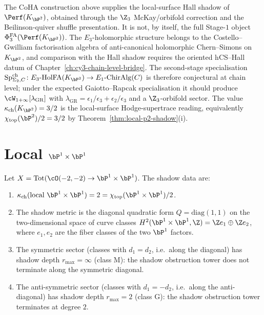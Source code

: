 \begin{remark}[Relation to \texorpdfstring{$\Phi_3$}{Phi-3} and \texorpdfstring{$\kappa_{\mathrm{ch}}(K_{\bP^2}) = 3/2$}{kappa-ch(K-P-2) = 3/2}]
\label{rem:local-p2-phi3-kappa}
The CoHA construction above supplies the local-surface Hall shadow of
$\Perf(K_{\bP^2})$, obtained through the $\Z_3$ McKay/orbifold
correction and the Beilinson-quiver shuffle presentation. It is not, by
itself, the full Stage-$1$ object
$\PhiFA_3(\Perf(K_{\bP^2}))$. The $E_3$-holomorphic structure belongs to
the Costello--Gwilliam factorisation algebra of anti-canonical
holomorphic Chern--Simons on $K_{\bP^2}$, and comparison with the Hall
shadow requires the oriented hCS--Hall datum of
Chapter~\ref{ch:cy3-chain-level-bridge}. The second-stage
specialisation
$\SpCh_{\Sigma_2,C}\colon E_3\text{-}\HolFA(K_{\bP^2})\to
E_1\text{-}\mathrm{ChirAlg}(C)$ is therefore conjectural at chain level;
under the expected Gaiotto--Rapcak specialisation it should produce
$\cW_{1+\infty}[\lambda_{\mathrm{GR}}]$ with
$\lambda_{\mathrm{GR}}=\epsilon_1/\epsilon_3+\epsilon_2/\epsilon_3$ and
a $\Z_3$-orbifold sector. The value
$\kappa_{\mathrm{ch}}(K_{\bP^2}) = 3/2$ is the local-surface
Hodge-supertrace reading, equivalently
$\chi_{\mathrm{top}}(\bP^2)/2=3/2$ by
Theorem~\ref{thm:local-p2-shadow}(i).
\end{remark}

\section{Local \texorpdfstring{$\bP^1 \times \bP^1$}{P-1 x P-1}}
\label{sec:local-p1p1}

\begin{theorem}
\label{thm:local-p1p1-shadow}
Let $X = \mathrm{Tot}(\cO(-2,-2) \to \bP^1 \times \bP^1)$. The shadow data are:
\begin{enumerate}[label=(\roman*)]
 \item $\kappa_{\mathrm{ch}}(\text{local } \bP^1 \times \bP^1) = 2 = \chi_{\mathrm{top}}(\bP^1 \times \bP^1)/2$.
 \item The shadow metric is the diagonal quadratic form $Q = \mathrm{diag}(1, 1)$ on the two-dimensional space of curve classes $H^2(\bP^1 \times \bP^1, \Z) = \Z e_1 \oplus \Z e_2$, where $e_1, e_2$ are the fiber classes of the two $\bP^1$ factors.
 \item The symmetric sector (classes with $d_1 = d_2$, i.e.\ along the diagonal) has shadow depth $r_{\max} = \infty$ (class M): the shadow obstruction tower does not terminate along the symmetric diagonal.
 \item The anti-symmetric sector (classes with $d_1 = -d_2$, i.e.\ along the anti-diagonal) has shadow depth $r_{\max} = 2$ (class G): the shadow obstruction tower terminates at degree $2$.
\end{enumerate}
\end{theorem}

